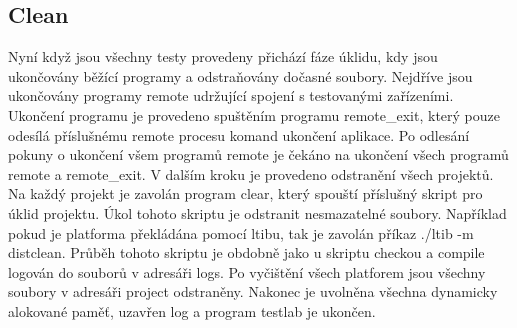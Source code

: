\subsection{Clean}
Nyní když jsou všechny testy provedeny přichází fáze úklidu, kdy jsou ukončovány běžící programy a odstraňovány dočasné soubory. Nejdříve jsou ukončovány programy remote udržující spojení s testovanými zařízeními. Ukončení programu je provedeno spuštěním programu remote\_exit, který pouze odesílá příslušnému remote procesu komand ukončení aplikace. Po odlesání pokuny o ukončení všem programů remote je čekáno na ukončení všech programů remote a remote\_exit. V dalším kroku je provedeno odstranění všech projektů. Na každý projekt je zavolán program clear, který spouští příslušný skript pro úklid projektu. Úkol tohoto skriptu je odstranit nesmazatelné soubory. Například pokud je platforma překládána pomocí ltibu, tak je zavolán příkaz ./ltib -m distclean. Průběh tohoto skriptu je obdobně jako u skriptu checkou a compile logován do souborů v adresáři logs.  Po vyčištění všech platforem jsou všechny soubory v adresáři project odstraněny. Nakonec je uvolněna všechna dynamicky alokované paměť, uzavřen log a program testlab je ukončen.


\endinput
